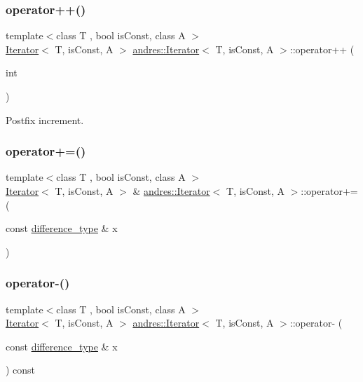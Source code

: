 \subsubsection{\texorpdfstring{operator++()}{operator++()}\hspace{0.1cm}{\footnotesize\ttfamily [2/2]}}
{\footnotesize\ttfamily template$<$class T , bool is\+Const, class A $>$ \\
\hyperlink{classandres_1_1Iterator}{Iterator}$<$ T, is\+Const, A $>$ \hyperlink{classandres_1_1Iterator}{andres\+::\+Iterator}$<$ T, is\+Const, A $>$\+::operator++ (\begin{DoxyParamCaption}\item[{int}]{ }\end{DoxyParamCaption})\hspace{0.3cm}{\ttfamily [inline]}}

Postfix increment. \mbox{\label{classandres_1_1Iterator_ad35d9bf0e2f5079c444353292f5def0c}} 
\subsubsection{\texorpdfstring{operator+=()}{operator+=()}}
{\footnotesize\ttfamily template$<$class T , bool is\+Const, class A $>$ \\
\hyperlink{classandres_1_1Iterator}{Iterator}$<$ T, is\+Const, A $>$ \& \hyperlink{classandres_1_1Iterator}{andres\+::\+Iterator}$<$ T, is\+Const, A $>$\+::operator+= (\begin{DoxyParamCaption}\item[{const \hyperlink{classandres_1_1Iterator_a10f8053d87b6b597d9fe011f66a240ca}{difference\+\_\+type} \&}]{x }\end{DoxyParamCaption})\hspace{0.3cm}{\ttfamily [inline]}}

\mbox{\label{classandres_1_1Iterator_aba616b917d32ebbe2535d6906c89d373}} 
\subsubsection{\texorpdfstring{operator-\/()}{operator-()}\hspace{0.1cm}{\footnotesize\ttfamily [1/2]}}
{\footnotesize\ttfamily template$<$class T , bool is\+Const, class A $>$ \\
\hyperlink{classandres_1_1Iterator}{Iterator}$<$ T, is\+Const, A $>$ \hyperlink{classandres_1_1Iterator}{andres\+::\+Iterator}$<$ T, is\+Const, A $>$\+::operator-\/ (\begin{DoxyParamCaption}\item[{const \hyperlink{classandres_1_1Iterator_a10f8053d87b6b597d9fe011f66a240ca}{difference\+\_\+type} \&}]{x }\end{DoxyParamCaption}) const\hspace{0.3cm}{\ttfamily [inline]}}

